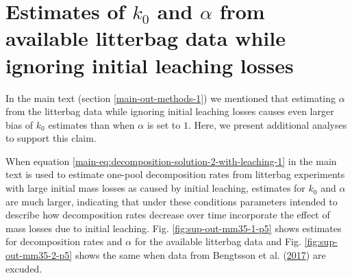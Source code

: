 \documentclass[
  12pt,
]{article}
\begin{document}
\hypertarget{sup-2}{%
\section{\texorpdfstring{Estimates of \(k_0\) and \(\alpha\) from available litterbag data while ignoring initial leaching losses}{Estimates of k\_0 and \textbackslash alpha from available litterbag data while ignoring initial leaching losses}}\label{sup-2}}

In the main text (section \ref{main-out-methods-1}) we mentioned that estimating \(\alpha\) from the litterbag data while ignoring initial leaching losses causes even larger bias of \(k_0\) estimates than when \(\alpha\) is set to \(1\). Here, we present additional analyses to support this claim.

When equation \ref{main-eq:decomposition-solution-2-with-leaching-1} in the main text is used to estimate one-pool decomposition rates from litterbag experiments with large initial mass losses as caused by initial leaching, estimates for \(k_0\) and \(\alpha\) are much larger, indicating that under these conditions parameters intended to describe how decomposition rates decrease over time incorporate the effect of mass losses due to initial leaching. Fig. \ref{fig:sup-out-mm35-1-p5} shows estimates for decomposition rates and \(\alpha\) for the available litterbag data and Fig. \ref{fig:sup-out-mm35-2-p5} shows the same when data from Bengtsson et al. (\protect\hyperlink{ref-Bengtsson.2017}{2017}) are excuded.
\end{document}
